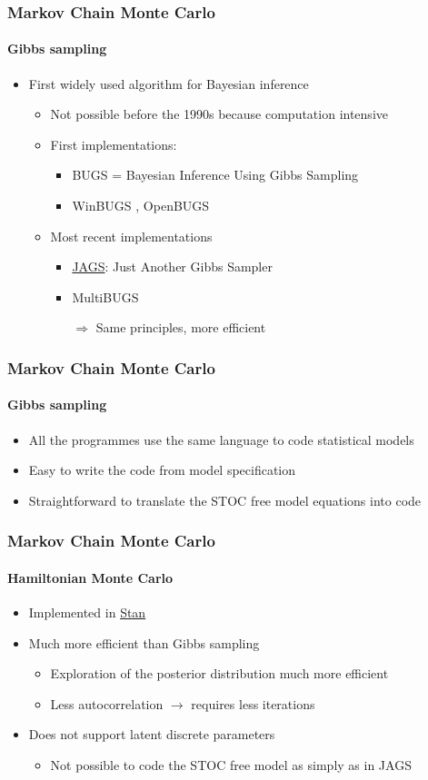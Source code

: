 \documentclass{beamer}
\begin{document}
\begin{frame}
\frametitle{Markov Chain Monte Carlo}
\framesubtitle{Gibbs sampling}
\begin{itemize}
 \item{First widely used algorithm for Bayesian inference}
 \begin{itemize}
 \item{Not possible before the 1990s because computation intensive}
 \item{First implementations:}
  \begin{itemize}
   \item{BUGS = Bayesian Inference Using Gibbs Sampling}
   \item{WinBUGS , OpenBUGS}
  \end{itemize}
 \item{Most recent implementations}
  \begin{itemize}
   \item{\href{https://sourceforge.net/projects/mcmc-jags/files/}{JAGS}: Just Another Gibbs Sampler}
   \item{MultiBUGS}
   \item[$\Rightarrow$]{Same principles, more efficient}
  \end{itemize}
 \end{itemize}
\end{itemize}
\end{frame}

\begin{frame}
\frametitle{Markov Chain Monte Carlo}
\framesubtitle{Gibbs sampling}
\begin{itemize}
 \item{All the programmes use the same language to code statistical models}
 \item{Easy to write the code from model specification}
 \item{Straightforward to translate the STOC free model equations into code}
\end{itemize}
\end{frame}

\begin{frame}
\frametitle{Markov Chain Monte Carlo}
\framesubtitle{Hamiltonian Monte Carlo}
\begin{itemize}
 \item{Implemented in \href{https://mc-stan.org}{Stan}}
 \item{Much more efficient than Gibbs sampling}
 \begin{itemize}
  \item{Exploration of the posterior distribution much more efficient}
  \item{Less autocorrelation $\rightarrow$ requires less iterations}
 \end{itemize}
 \item{Does not support latent discrete parameters}
 \begin{itemize}
  \item{Not possible to code the STOC free model as simply as in JAGS}
 \end{itemize}
\end{itemize}
\end{frame}
\end{document}
